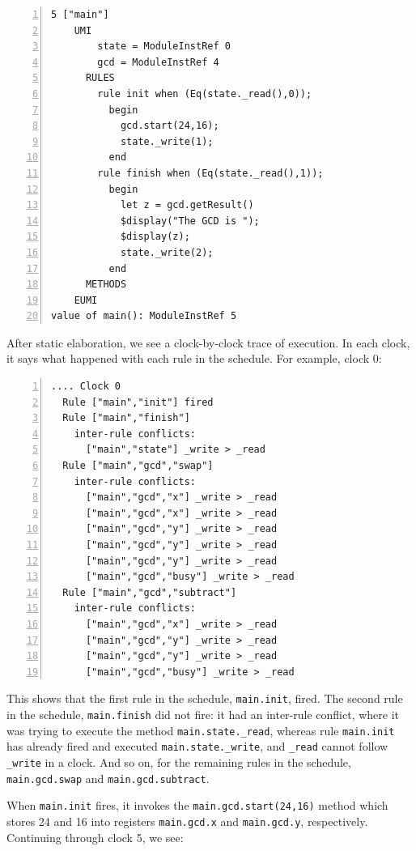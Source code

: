 \documentclass[11pt]{article}
\newcommand{\term}[1]{\texttt{#1}}
\begin{document}
\begin{Verbatim}[frame=single, numbers=left, commandchars=\\\{\}]
  5 ["main"]
    UMI 
        state = ModuleInstRef 0
        gcd = ModuleInstRef 4
      RULES
        rule init when (Eq(state._read(),0));
          begin
            gcd.start(24,16);
            state._write(1);
          end
        rule finish when (Eq(state._read(),1));
          begin
            let z = gcd.getResult()
            $display("The GCD is ");
            $display(z);
            state._write(2);
          end
      METHODS
    EUMI
value of main(): ModuleInstRef 5
\end{Verbatim}

After static elaboration, we see a clock-by-clock trace of execution.
In each clock, it says what happened with each rule in the schedule.
For example, clock 0:

\begin{Verbatim}[frame=single, numbers=left, commandchars=\\\{\}]
.... Clock 0
  Rule ["main","init"] fired
  Rule ["main","finish"]
    inter-rule conflicts:
      ["main","state"] _write > _read
  Rule ["main","gcd","swap"]
    inter-rule conflicts:
      ["main","gcd","x"] _write > _read
      ["main","gcd","x"] _write > _read
      ["main","gcd","y"] _write > _read
      ["main","gcd","y"] _write > _read
      ["main","gcd","y"] _write > _read
      ["main","gcd","busy"] _write > _read
  Rule ["main","gcd","subtract"]
    inter-rule conflicts:
      ["main","gcd","x"] _write > _read
      ["main","gcd","y"] _write > _read
      ["main","gcd","y"] _write > _read
      ["main","gcd","busy"] _write > _read
\end{Verbatim}

This shows that the first rule in the schedule, \term{main.init},
fired.  The second rule in the schedule, \term{main.finish} did not
fire: it had an inter-rule conflict, where it was trying to execute
the method \verb|main.state._read|, whereas rule \verb|main.init| has
already fired and executed \verb|main.state._write|, and \verb|_read|
cannot follow \verb|_write| in a clock.  And so on, for the remaining
rules in the schedule, \verb|main.gcd.swap| and
\verb|main.gcd.subtract|.

When \term{main.init} fires, it invokes the
\term{main.gcd.start(24,16)} method which stores 24 and 16 into
registers \term{main.gcd.x} and \term{main.gcd.y}, respectively.
Continuing through clock 5, we see:
\end{document}
